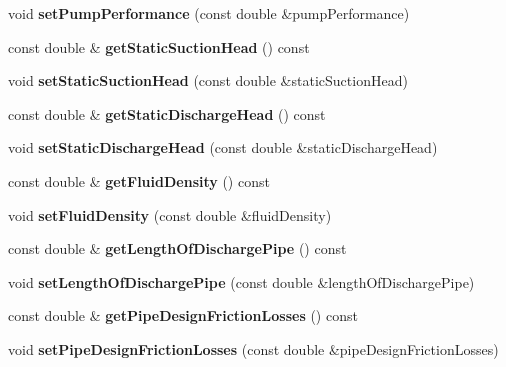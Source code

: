 \begin{DoxyCompactItemize}
void {\bfseries set\+Pump\+Performance} (const double \&pump\+Performance)
\item 
\mbox{\label{class_pump_data_a2554114859d7d7184577a188beb9fa4a}} 
const double \& {\bfseries get\+Static\+Suction\+Head} () const
\item 
\mbox{\label{class_pump_data_a331cc7f6ee1f3a2eb798ac8416ac88c7}} 
void {\bfseries set\+Static\+Suction\+Head} (const double \&static\+Suction\+Head)
\item 
\mbox{\label{class_pump_data_ad47d64e60bf8e329fb8c5ee7b89c5f9f}} 
const double \& {\bfseries get\+Static\+Discharge\+Head} () const
\item 
\mbox{\label{class_pump_data_a2592c5b7b23bfcdbf91b2296c69c01be}} 
void {\bfseries set\+Static\+Discharge\+Head} (const double \&static\+Discharge\+Head)
\item 
\mbox{\label{class_pump_data_a0c21e7c517eb15d3cc1fea551fbc69a3}} 
const double \& {\bfseries get\+Fluid\+Density} () const
\item 
\mbox{\label{class_pump_data_a2ce9e3a645295f5c07fc8ecb7af7a85e}} 
void {\bfseries set\+Fluid\+Density} (const double \&fluid\+Density)
\item 
\mbox{\label{class_pump_data_a4530a7f9ca451ff287953e67004d0cd8}} 
const double \& {\bfseries get\+Length\+Of\+Discharge\+Pipe} () const
\item 
\mbox{\label{class_pump_data_ae65ccbb7436899b7e7103669651c637a}} 
void {\bfseries set\+Length\+Of\+Discharge\+Pipe} (const double \&length\+Of\+Discharge\+Pipe)
\item 
\mbox{\label{class_pump_data_aff5890f3c88b78ef38d51fa2d95e1c22}} 
const double \& {\bfseries get\+Pipe\+Design\+Friction\+Losses} () const
\item 
\mbox{\label{class_pump_data_afaf58ba66b7714878a0180b332da17b9}} 
void {\bfseries set\+Pipe\+Design\+Friction\+Losses} (const double \&pipe\+Design\+Friction\+Losses)

\end{DoxyCompactItemize}

